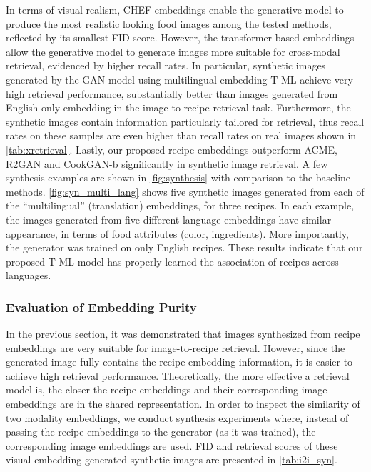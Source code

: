 \documentclass[sigconf,nonacm]{acmart}
\begin{document}
In terms of visual realism, CHEF embeddings enable the generative model to produce the most realistic looking food images among the tested methods, reflected by its smallest FID score. However, the transformer-based embeddings allow the generative model to generate images more suitable for cross-modal retrieval, evidenced by higher recall rates. In particular, synthetic images generated by the GAN model using multilingual embedding T-ML achieve very high retrieval performance, substantially better than images generated from English-only embedding in the image-to-recipe retrieval task. Furthermore, the synthetic images contain information particularly tailored for retrieval, thus recall rates on these samples are even higher than recall rates on real images shown in \autoref{tab:xretrieval}. Lastly, our proposed recipe embeddings outperform ACME, R2GAN and CookGAN-b significantly in synthetic image retrieval. A few synthesis examples are shown in \autoref{fig:synthesis} with comparison to the baseline methods. \autoref{fig:syn_multi_lang} shows five synthetic images generated from each of the ``multilingual'' (translation) embeddings, for three recipes. In each example, the images generated from five different language embeddings have similar appearance, in terms of food attributes (color, ingredients). More importantly, the generator was trained on only English recipes. These results indicate that our proposed T-ML model has properly learned the association of recipes across languages.


\subsubsection{\textbf{Evaluation of Embedding Purity}}

In the previous section, it was demonstrated that images synthesized from recipe embeddings are very suitable for image-to-recipe retrieval. However, since the generated image fully contains the recipe embedding information, it is easier to achieve high retrieval performance. Theoretically, the more effective a retrieval model is, the closer the recipe embeddings and their corresponding image embeddings are in the shared representation. In order to inspect the similarity of two modality embeddings, we conduct synthesis experiments where, instead of passing the recipe embeddings  to the generator  (as it was trained), the corresponding image embeddings  are used. FID and retrieval scores of these visual embedding-generated synthetic images are presented in \autoref{tab:i2i_syn}.
\end{document}
